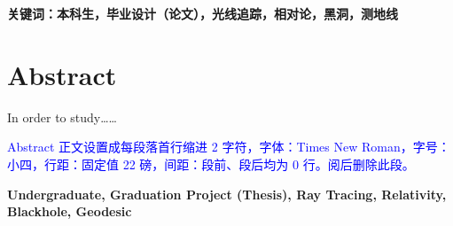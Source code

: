 \vspace{4ex}\noindent\textbf{\heiti 关键词：本科生，毕业设计（论文），光线追踪，相对论，黑洞，测地线}
\newpage

\topskip=0pt

\vspace*{2mm}

\begin{spacing}{0.95}
  \centering
  \heiti{}\textbf{\thesisTitleEN}
\end{spacing}

\vspace*{17mm}

{\let\clearpage\relax \chapter*{
  \textmd{Abstract}\vskip -3bp}}
\setcounter{page}{2}

\setlength{\parskip}{0em}

In order to study……

\textcolor{blue}{Abstract 正文设置成每段落首行缩进 2 字符，字体：Times New Roman，字号：小四，行距：固定值 22 磅，间距：段前、段后均为 0 行。阅后删除此段。}

\vspace{3ex}\noindent\textbf{Undergraduate, Graduation Project (Thesis), Ray Tracing, Relativity, Blackhole, Geodesic}
\newpage
